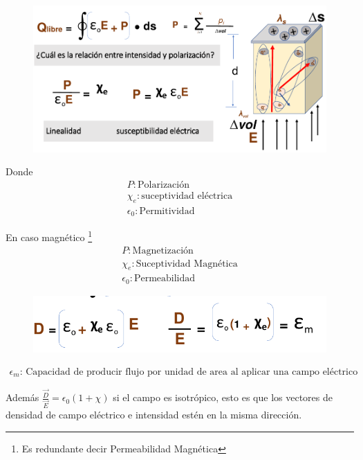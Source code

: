 \documentclass[12pt,letterpaper]{book}
\begin{document}
\begin{figure}[H]
\centering
\includegraphics[width=1\linewidth]{figures/carFre4.png}
\caption{}
\label{carFre4}
\end{figure}
\vspace{0.2cm}

Donde
\begin{align*}
P: \text{Polarización}\\
\chi _e: \text{suceptividad eléctrica}\\
\epsilon _0: \text{Permitividad}
\end{align*}

En caso magnético \footnote{Es redundante decir Permeabilidad Magnética}
\begin{align*}
P: \text{Magnetización} \\
\chi _e: \text{Suceptividad Magnética}\\
\epsilon _0: \text{Permeabilidad } 
\end{align*}


\begin{figure}[H]
\centering
\includegraphics[width=1\linewidth]{figures/carFre5.png}
\caption{}
\label{carFre5}
\end{figure}
\vspace{0.2cm}


\begin{align*}
\epsilon _m \text{: Capacidad de producir flujo por unidad de area al aplicar una campo eléctrico}
\end{align*}

Además $\frac{\vec{D}}{\vec{E}}=\epsilon _0(1+\chi )$ si el campo es isotrópico, esto es que los vectores de densidad de campo eléctrico e intensidad estén en la misma dirección.
\end{document}
